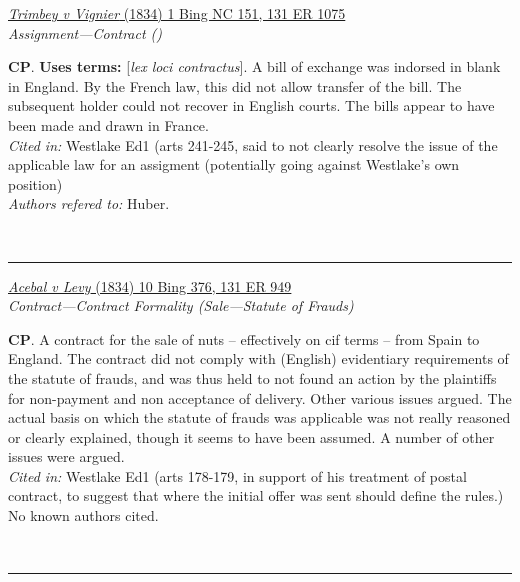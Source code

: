 \documentclass[twoside]{article}
\begin{document}
        \begin{small}
        \begin{center}
        \href{https://heinonline.org/HOL/P?h=hein.engrep/engrg0131&i=1079}{\textit{Trimbey v Vignier} (1834) 1 Bing NC 151, 131 ER 1075} \label{80} \\ 
\textit{Assignment---Contract ()}\\
        \end{center}
        \textbf{CP}.  \textbf{Uses terms: }[\textit{lex loci contractus}]. A bill of exchange was indorsed in blank in England. By the French law, this did not allow transfer of the bill. The subsequent holder could not recover in English courts. The bills appear to have been made and drawn in France.\\\textit{Cited in: }Westlake Ed1 (arts 241-245, said to not clearly resolve the issue of the applicable law for an assigment (potentially going against Westlake’s own position)\\\textit{Authors refered to: }Huber.
        \end{small}\\
        \rule{\textwidth}{0.5pt}
        

        \begin{small}
        \begin{center}
        \href{https://heinonline.org/HOL/P?h=hein.engrep/engrg0131&i=953}{\textit{Acebal v Levy} (1834) 10 Bing 376, 131 ER 949} \label{84} \\ 
\textit{Contract---Contract Formality (Sale---Statute of Frauds)}\\
        \end{center}
        \textbf{CP}. A contract for the sale of nuts – effectively on cif terms – from Spain to England. The contract  did not comply with (English) evidentiary requirements of the statute of frauds, and was thus held to not found an action by the plaintiffs for non-payment and non acceptance of delivery. Other various issues argued.  The actual basis on which the statute of frauds was applicable was not really reasoned or clearly explained, though it seems to have been assumed. A number of other issues were argued.\\\textit{Cited in: }Westlake Ed1 (arts 178-179, in support of his treatment of postal contract, to suggest that where the initial offer was sent should define the rules.)\\No known authors cited.
        \end{small}\\
        \rule{\textwidth}{0.5pt}
        
\end{document}
